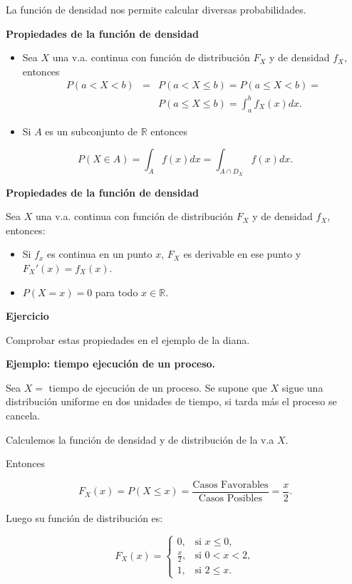 \documentclass[]{book}
\providecommand{\tightlist}{%
  \setlength{\itemsep}{0pt}\setlength{\parskip}{0pt}}
\begin{document}
La función de densidad nos permite calcular diversas probabilidades.

\textbf{Propiedades de la función de densidad}

\begin{itemize}
\item
  Sea \(X\) una v.a. continua con función de distribución \(F_X\) y de
  densidad \(f_X\), entonces
  \begin{eqnarray*}
  P(a< X< b) &=&  P(a<X\leq b)= P(a\leq X< b)=\\
   & & P(a\leq X\leq b)= \displaystyle\int_{a}^b f_X(x) dx.
  \end{eqnarray*}
\item
  Si \(A\) es un subconjunto de \(\mathbb{R}\) entonces
\end{itemize}

\[
P(X\in A)=\displaystyle\int_{A} f(x) dx=\displaystyle\int_{A\cap D_X} f(x) dx.
\]

\textbf{Propiedades de la función de densidad}

Sea \(X\) una v.a. continua con función de distribución \(F_X\) y de densidad \(f_X\), entonces:

\begin{itemize}
\tightlist
\item
  Si \(f_x\) es continua en un punto \(x\), \(F_X\) es derivable en ese punto y
  \(F_X'(x)=f_X(x).\)
\item
  \(P(X=x)=0\) para todo \(x\in\mathbb{R}.\)
\end{itemize}

\textbf{Ejercicio}

Comprobar estas propiedades en el ejemplo de la diana.

\textbf{Ejemplo: tiempo ejecución de un proceso.}

Sea \(X=\) tiempo de ejecución de un proceso. Se supone que \(X\) sigue una distribución uniforme en dos unidades de tiempo, si tarda más el proceso se cancela.

Calculemos la función de densidad y de distribución de la v.a \(X\).

Entonces

\[
F_{X}(x)=P(X\leq x)=\frac{\mbox{Casos Favorables}}{\mbox{Casos Posibles}}=\frac{x}2.
\]

Luego su función de distribución es:

\[
F_{X}(x)=\left\{\begin{array}{ll}
0, & \mbox{si } x\leq 0,\\[1ex]
\frac{x}2, & \mbox{si } 0<x<2,\\[1ex]
1, & \mbox{si } 2\leq x.
\end{array}\right.
\]
\end{document}
